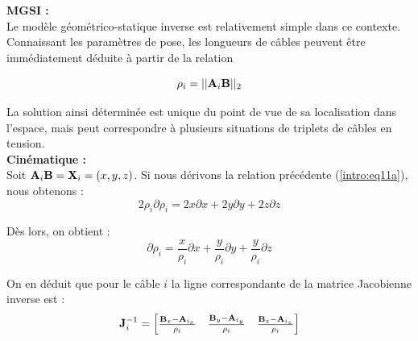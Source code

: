 {\bf MGSI :}\\

Le mod\`ele g\'eom\'etrico-statique inverse est relativement simple dans ce 
contexte. Connaissant les param\`etres de pose, les longueurs de c\^ables 
peuvent \^etre imm\'ediatement d\'eduite \`a partir de la relation 

\begin{equation}
\rho_i = ||{\bf A}_i{\bf B}||_2
\label{intro:eq11a}
\end{equation}

La solution ainsi d\'etermin\'ee est unique du point de vue de sa localisation 
dans l'espace, mais peut correspondre \`a plusieurs situations de triplets de 
c\^ables en tension.\\

{\bf Cin\'ematique :}\\

Soit ${\bf A}_i{\bf B} = {\bf X}_i = (x, y, z)$. Si nous d\'erivons la relation 
pr\'ec\'edente (\ref{intro:eq11a}), nous obtenons :
\begin{equation}
2 \rho_i \partial \rho_i = 2 x \partial x + 2 y \partial y + 2 z \partial z
\label{intro:eq11a2}
\end{equation}

D\`es lors, on obtient :
\begin{equation}
\partial {\rho_i} = \frac x {\rho_i} \partial x + \frac y {\rho_i} \partial y + \frac y 
{\rho_i} \partial z
\label{intro:eq11a3}
\end{equation}

On en d\'eduit que pour le c\^able $i$ la ligne correspondante de la 
matrice Jaco\-bienne inverse est :
\begin{equation}
{\bf J}^{-1}_i = 
\begin{bmatrix}
\frac {{\bf B}_x - {\bf A}_{i_x}} {\rho_i} & \frac {{\bf B}_y - {\bf A}_{i_y}} 
{\rho_i} & \frac {{\bf B}_z - {\bf A}_{i_z}} {\rho_i} 
\end{bmatrix}
\label{intro:eq11a4}
\end{equation}




\vfill